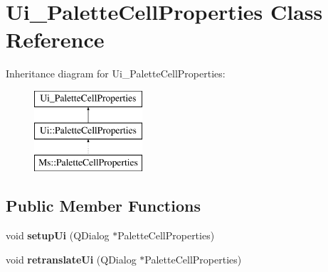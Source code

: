 \hypertarget{class_ui___palette_cell_properties}{}\section{Ui\+\_\+\+Palette\+Cell\+Properties Class Reference}
\label{class_ui___palette_cell_properties}
Inheritance diagram for Ui\+\_\+\+Palette\+Cell\+Properties\+:\begin{figure}[H]
\begin{center}
\leavevmode
\includegraphics[height=3.000000cm]{class_ui___palette_cell_properties}
\end{center}
\end{figure}
\subsection*{Public Member Functions}
\begin{DoxyCompactItemize}
\item 
\mbox{\label{class_ui___palette_cell_properties_a9a64b2b87920a115be111ebeedde8d7e}} 
void {\bfseries setup\+Ui} (Q\+Dialog $\ast$Palette\+Cell\+Properties)
\item 
\mbox{\label{class_ui___palette_cell_properties_a32082f446b6a90fa6b194a2642993c16}} 
void {\bfseries retranslate\+Ui} (Q\+Dialog $\ast$Palette\+Cell\+Properties)
\end{DoxyCompactItemize}
